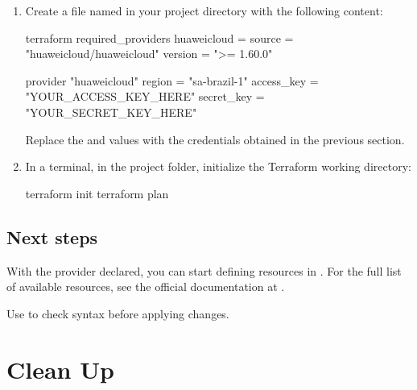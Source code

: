 \documentclass[english]{guide}
\begin{document}
\passoapasso
\begin{enumerate}
  \item Create a file named  in your project directory
        with the following content:

  \begin{codigo}
terraform {
  required_providers {
    huaweicloud = {
      source  = "huaweicloud/huaweicloud"
      version = ">= 1.60.0"
    }
  }
}

provider "huaweicloud" {
  region     = "sa-brazil-1"
  access_key = "YOUR_ACCESS_KEY_HERE"
  secret_key = "YOUR_SECRET_KEY_HERE"
}
  \end{codigo}

  Replace the  and  values with the
  credentials obtained in the previous section.

  \item In a terminal, in the project folder, initialize the Terraform
        working directory:

  \begin{codigo}[bash]
terraform init
terraform plan
  \end{codigo}

\end{enumerate}

\subsection{Next steps}

With the provider declared, you can start defining resources in
. For the full list of available resources, see the official
documentation at
.

\begin{dica}
Use  to check syntax before applying changes.
\end{dica}


\section{Clean Up}
\end{document}
